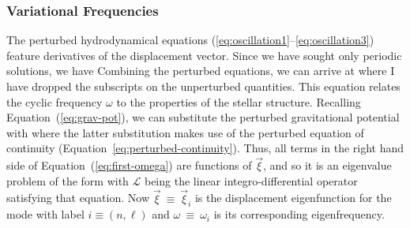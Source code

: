 \subsubsection*{Variational Frequencies}
The perturbed hydrodynamical equations  (\ref{eq:oscillation1}--\ref{eq:oscillation3}) feature derivatives of the displacement vector. 
Since we have sought only periodic solutions, we have
Combining the perturbed equations, we can arrive at \citep[e.g.,][]{1979nos..book.....U}
where I have dropped the subscripts on the unperturbed quantities. 
This equation relates the cyclic frequency $\omega$ to the properties of the stellar structure. 
Recalling Equation~(\ref{eq:grav-pot}), we can substitute the perturbed gravitational potential with 
where the latter substitution makes use of the perturbed equation of continuity (Equation~\ref{eq:perturbed-continuity}). 
Thus, all terms in the right hand side of Equation~(\ref{eq:first-omega}) are functions of $\vec\xi$, and so it is an eigenvalue problem of the form
with $\mathcal{L}$ being the linear integro-differential operator satisfying that equation. 
Now ${\vec\xi~\equiv~\vec\xi_i}$ is the displacement eigenfunction for the mode with label ${i\equiv(n,\ell)}$ and ${\omega~\equiv~\omega_i}$ is its corresponding eigenfrequency. 

